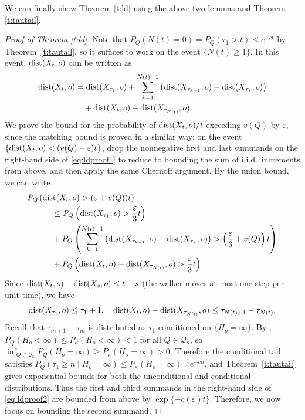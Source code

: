 \documentclass[a4paper]{amsart}
\newcommand{\D}[1]{{\rm dist}(X_{#1},o)}
\begin{document}
We can finally show Theorem \ref{t:ld} using the above two lemmas and Theorem \ref{t:tautail}.

\begin{proof}[Proof of Theorem \ref{t:ld}]

Note that $P_Q(N(t) = 0) = P_Q(\tau_1 > t) \leq e^{-ct}$ by Theorem~\ref{t:tautail}, so it suffices to work on the event $\{N(t) \geq 1\}$. In this event, $\D{t}$ can be written as
\begin{align}
    \D{t} \label{eq:ldproof1}
    & =
        \D{\tau_1}
        +
        \sum_{k = 1}^{N(t)-1}
            \left(
                \D{\tau_{k+1}}
                -
                \D{\tau_{k}}
            \right)
    \\ & \quad + \nonumber        
        \D{t} - \D{\tau_{N(t)}}.
\end{align}
We prove the bound for the probability of $\D{t}/t$ exceeding $v(Q)$ by $\varepsilon$, since the matching bound is proved in a similar way: on the event $\{\D{t} < (v(Q) - \varepsilon)t\}$, drop the nonnegative first and last summands on the right-hand side of \eqref{eq:ldproof1} to reduce to bounding the sum of i.i.d.\ increments from above, and then apply the same Chernoff argument. By the union bound, we can write
\begin{align}
    & P_Q 
        \left(
            \D{t} > 
            (\varepsilon + v(Q)) t
        \right)
    \nonumber
    \\
    &  \quad\quad\quad \label{eq:ldproof2}
    \leq    
    P_Q 
        \left(
            \D{\tau_1} > 
            \frac{\varepsilon}{3} t
        \right)
    \\
    & \quad\quad\quad \nonumber
    + 
    P_Q 
    \left(
        \sum_{k = 1}^{N(t)-1}
            \left(
                \D{\tau_{k+1}}
                -
                \D{\tau_{k}}
            \right) > 
        \left(
            \frac{\varepsilon}{3} 
            + 
            v(Q)
        \right)
        t
    \right)
    \\
    & \quad\quad\quad \nonumber
    +   
    P_Q 
        \left(
            \D{t} - \D{\tau_{N(t)}} > 
            \frac{\varepsilon}{3} t
        \right)
\end{align}
Since $\D{t} - \D{s} \leq t - s$ (the walker moves at most one step per unit time), we have
\[
    \D{\tau_1} 
        \leq \tau_1 + 1, 
    \quad 
    \D{t} - \D{\tau_{N(t)}} 
        \leq \tau_{N(t)+1} - \tau_{N(t)}.
\]
Recall that $\tau_{m+1} - \tau_{m}$ is distributed as $\tau_1$ conditioned on $\{H_o = \infty \}$. By \cite[Lemma~1]{ribeiro2023}, $P_Q(H_o < \infty) \le P_\kappa(H_o < \infty) < 1$ for all $Q \in \mathcal{Q}_\kappa$, so $\inf_{Q \in \mathcal{Q}_\kappa}P_Q(H_o = \infty) \ge P_\kappa(H_o = \infty) > 0$. Therefore the conditional tail satisfies $P_Q(\tau_1 \ge n \mid H_o = \infty) \le P_\kappa(H_o = \infty)^{-1}e^{-cn}$, and Theorem~\ref{t:tautail} gives exponential bounds for both the unconditional and conditional distributions. Thus the first and third summands in the right-hand side of \eqref{eq:ldproof2} are bounded from above by $\exp\{-c(\varepsilon)t\}$. Therefore, we now focus on bounding the second summand.
    

\end{proof}
\end{document}
